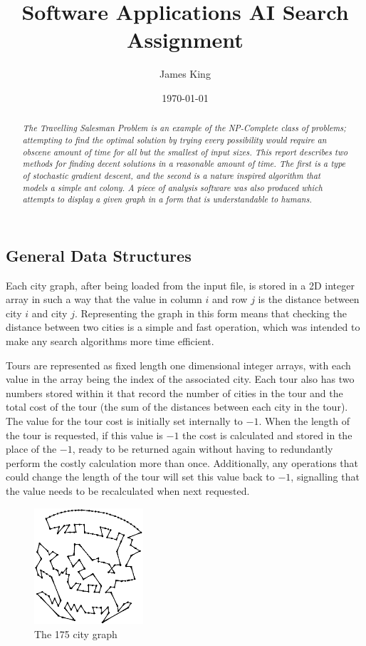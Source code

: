 \documentclass[a4paper,11pt]{article}
\title{Software Applications AI Search Assignment}
\date{\today}
\author{James King}
\begin{document}
\maketitle

\begin{abstract}
\emph{The Travelling Salesman Problem is an example of the NP-Complete class of
problems; attempting to find the optimal solution by trying every possibility
would require an obscene amount of time for all but the smallest of input
sizes. This report describes two methods for finding decent solutions in a 
reasonable amount of time. The first is a type of stochastic gradient descent,
and the second is a nature inspired algorithm that models a simple ant colony.
A piece of analysis software was also produced which attempts to display a
given graph in a form that is understandable to humans.}
\end{abstract}

\subsection*{General Data Structures}
Each city graph, after being loaded from the input file, is stored in a 2D
integer array in such a way that the value in column $i$ and row $j$ is the
distance between city $i$ and city $j$. Representing the graph in this form
means that checking the distance between two cities is a simple and fast
operation, which was intended to make any search algorithms more time
efficient.

Tours are represented as fixed length one dimensional integer arrays, with
each value in the array being the index of the associated city. Each tour also
has two numbers stored within it that record the number of cities in the tour
and the total cost of the tour (the sum of the distances between each city in
the tour). The value for the tour cost is initially set internally to $-1$.
When the length of the tour is requested, if this value is $-1$ the cost is
calculated and stored in the place of the $-1$, ready to be returned again
without having to redundantly perform the costly calculation more than once. 
Additionally, any operations that could change the length of the tour will set
this value back to $-1$, signalling that the value needs to be recalculated
when next requested.

\begin{figure}
\includegraphics[width=0.36\textwidth]{175vis}
\caption{The 175 city graph}
\end{figure}
\end{document}
